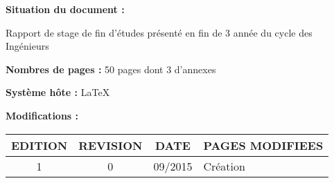 \textbf{Situation du document :} 
\vspace{0.2cm}
\par
Rapport de stage de fin d'études présenté en fin de 3 année du cycle des Ingénieurs
\vspace{0.3cm}



\textbf{Nombres de pages :} 50 pages dont 3 d'annexes
\vspace{0.3cm}

\textbf{Système hôte :} \LaTeX
\vspace{1cm}


\textbf{Modifications :} 
\begin{center}
\begin{tabular}{|c|c|c|>{\centering}p{6.5cm}|}
\hline 
EDITION & REVISION & DATE & PAGES MODIFIEES\tabularnewline
\hline
\hline 
1 & 0 & 09/2015 & Création\tabularnewline
\hline 

\end{tabular}
\end{center}